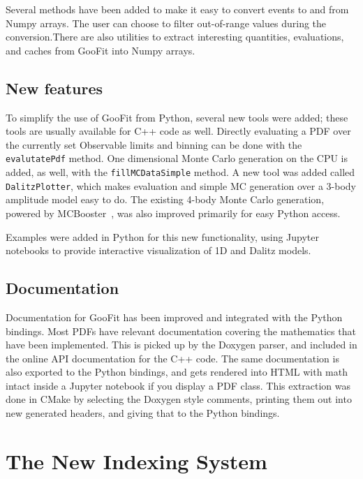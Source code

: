 \documentclass{webofc}
\begin{document}
Several methods have been added to make it easy to convert events to and from Numpy arrays. The user can choose to filter out-of-range values during the conversion.There are also utilities to extract interesting quantities, evaluations, and caches from GooFit into Numpy arrays. 

\subsection{New features}

To simplify the use of GooFit from Python, several new tools were added; these tools are usually available for C++ code as well. Directly evaluating a PDF over the currently set Observable limits and binning can be done with the \texttt{evalutatePdf} method. One dimensional Monte Carlo generation on the CPU is added, as well, with the \texttt{fillMCDataSimple} method. A new tool was added called \texttt{DalitzPlotter}, which makes evaluation and simple MC generation over a 3-body amplitude model easy to do. The existing 4-body Monte Carlo generation, powered by MCBooster~\cite{lib:MCBooster}, was also improved primarily for easy Python access.

Examples were added in Python for this new functionality, using Jupyter notebooks to provide interactive visualization of 1D and Dalitz models.

\subsection{Documentation}

Documentation for GooFit has been improved and integrated with the Python bindings. Most PDFs have relevant documentation covering the mathematics that have been implemented. This is picked up by the Doxygen parser, and included in the online API documentation for the C++ code. The same documentation is also exported to the Python bindings, and gets rendered into HTML with math intact inside a Jupyter notebook if you display a PDF class. This extraction was done in CMake by selecting the Doxygen style comments, printing them out into new generated headers, and giving that to the Python bindings.

\section{The New Indexing System}
\label{sec-ind}
\end{document}
